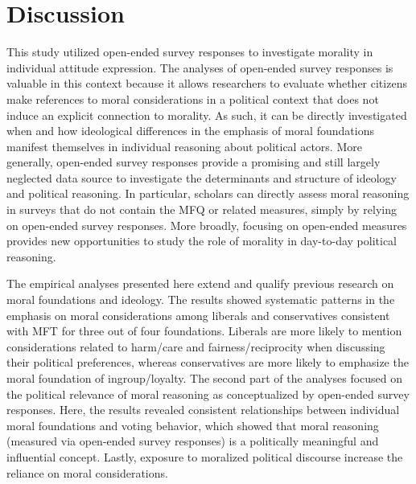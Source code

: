 \documentclass[12pt]{article}
\begin{document}
\section*{Discussion}


This study utilized open-ended survey responses to investigate morality in individual attitude expression. The analyses of open-ended survey responses is valuable in this context because it allows researchers to evaluate whether citizens make references to moral considerations in a political context that does not induce an explicit connection to morality. As such, it can be directly investigated when and how ideological differences in the emphasis of moral foundations manifest themselves in individual reasoning about political actors. More generally, open-ended survey responses provide a promising and still largely neglected data source to investigate the determinants and structure of ideology and political reasoning. In particular, scholars can directly assess moral reasoning in surveys that do not contain the MFQ or related measures, simply by relying on open-ended survey responses. More broadly, focusing on open-ended measures provides new opportunities to study the role of morality in day-to-day political reasoning.

The empirical analyses presented here extend and qualify previous research on moral foundations and ideology. The results showed systematic patterns in the emphasis on moral considerations among liberals and conservatives consistent with MFT for three out of four foundations. Liberals are more likely to mention considerations related to harm/care and fairness/reciprocity when discussing their political preferences, whereas conservatives are more likely to emphasize the moral foundation of ingroup/loyalty. The second part of the analyses focused on the political relevance of moral reasoning as conceptualized by open-ended survey responses. Here, the results revealed consistent relationships between individual moral foundations and voting behavior, which showed that moral reasoning (measured via open-ended survey responses) is a politically meaningful and influential concept. Lastly, exposure to moralized political discourse increase the reliance on moral considerations. 
\end{document}
